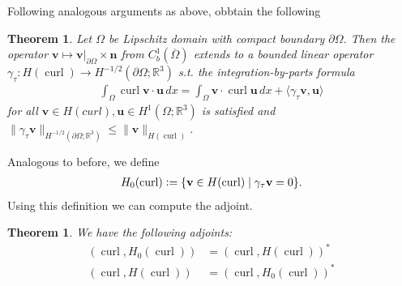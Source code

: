 \documentclass[12pt,a4paper]{article}
\numberwithin{equation}{subsection}
\numberwithin{lemma}{subsection}
\newtheorem{theorem}[lemma]{Theorem}
\theoremstyle{definition}
\DeclareMathOperator{\curl}{curl}
\newcommand{\real}{\mathbb{R}}
\begin{document}
Following analogous arguments as above, obbtain the following 
\begin{theorem}\label{thm:trace_hcurl}
    Let $\Omega$ be Lipschitz domain with compact boundary $\partial \Omega$.
    Then the operator $\mathbf{v} \mapsto \mathbf{v}|_{\partial \Omega} \times \mathbf{n}$ 
    from $C^1_b(\overline{\Omega})$ extends to a bounded linear operator 
    $\gamma_\tau: H(\curl) \rightarrow H^{-1/2}(\partial \Omega; \real^3)$ 
    s.t. the integration-by-parts formula 
    \begin{align*}
        \int_\Omega \curl \mathbf{v} \cdot \mathbf{u} \, dx = 
            \int_\Omega \mathbf{v} \cdot \curl \mathbf{u} \, dx
            + \langle \gamma_\tau \boldsymbol{v}, \boldsymbol{u} \rangle
    \end{align*}
    for all $\boldsymbol{v} \in H(curl), \boldsymbol{u} \in H^1(\Omega;\real^3)$
    is satisfied and 
    $\lVert \gamma_\tau \mathbf{v} \rVert _{H^{-1/2}(\partial \Omega; \real^3)} 
    \leq \lVert \mathbf{v} \rVert _{H(\curl)}$. 
\end{theorem}
Analogous to before, we define 
\begin{align*}
    H_0(\curl) \vcentcolon= \{ \mathbf{v} \in H(\curl) \mid \gamma_\tau \mathbf{v} = 0\}.
\end{align*}
Using this definition we can compute the adjoint.
\begin{theorem}
    We have the following adjoints:
    \begin{align*}
        (\curl, H_0(\curl)) &= (\curl, H(\curl))^* 
        \\ (\curl, H(\curl)) &= (\curl, H_0(\curl))^* 
    \end{align*}
\end{theorem}
\end{document}
